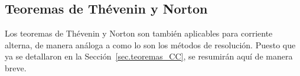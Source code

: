 \begin{example}
	\end{example}
	
	\subsection{Teoremas de Thévenin y Norton}
    Los teoremas de Thévenin y Norton son también aplicables para corriente alterna, de manera análoga a como lo son los métodos de resolución. Puesto que ya se detallaron en la Sección~\ref{sec.teoremas_CC}, se resumirán aquí de manera breve. 


